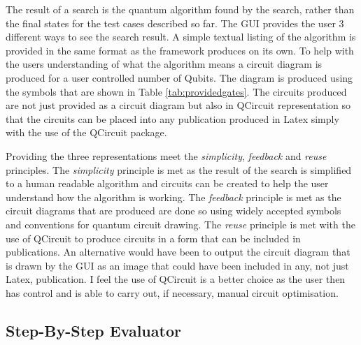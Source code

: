 The result of a search is the quantum algorithm found by the search, rather than the final states for the test cases described so far.
The GUI provides the user 3 different ways to see the search result.
A simple textual listing of the algorithm is provided in the same format as the framework produces on its own.
To help with the users understanding of what the algorithm means a circuit diagram is produced for a user controlled number of Qubits.
The diagram is produced using the symbols that are shown in Table \ref{tab:providedgates}.
The circuits produced are not just provided as a circuit diagram but also in QCircuit representation so that the circuits can be placed into any publication produced in Latex simply with the use of the QCircuit package.

Providing the three representations meet the \emph{simplicity}, \emph{feedback} and \emph{reuse} principles.
The \emph{simplicity} principle is met as the result of the search is simplified to a human readable algorithm and circuits can be created to help the user understand how the algorithm is working.
The \emph{feedback} principle is met as the circuit diagrams that are produced are done so using widely accepted symbols and conventions for quantum circuit drawing.
The \emph{reuse} principle is met with the use of QCircuit to produce circuits in a form that can be included in publications.
An alternative would have been to output the circuit diagram that is drawn by the GUI as an image that could have been included in any, not just Latex, publication.
I feel the use of QCircuit is a better choice as the user then has control and is able to carry out, if necessary, manual circuit optimisation.

\subsection{Step-By-Step Evaluator}
\label{sec:sbse}

